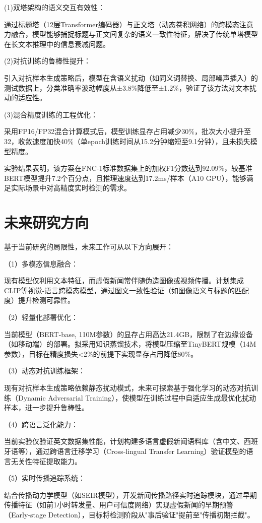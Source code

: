 \documentclass{cjc}
\begin{document}
(1)双塔架构的语义交互有效性：

通过标题塔（12层Transformer编码器）与正文塔（动态卷积网络）的跨模态注意力融合，模型能够捕捉标题与正文间复杂的语义一致性特征，解决了传统单塔模型在长文本推理中的信息衰减问题。

(2)对抗训练的鲁棒性提升：

引入对抗样本生成策略后，模型在含语义扰动（如同义词替换、局部噪声插入）的测试数据上，分类准确率波动幅度从±3.8\%降低至±1.2\%，验证了该方法对文本扰动的适应性。

(3)混合精度训练的工程优化：

采用FP16/FP32混合计算模式后，模型训练显存占用减少30\%，批次大小提升至32，收敛速度加快40\%（单epoch训练时间从15.2分钟缩短至9.1分钟），且未损失模型精度。

实验结果表明，该方案在FNC-1标准数据集上的加权F1分数达到92.09\%，较基准BERT模型提升7.2个百分点，且推理速度达到17.2ms/样本（A10 GPU），能够满足实际场景中对高精度实时检测的需求。

\section{未来研究方向}

基于当前研究的局限性，未来工作可从以下方向展开：

（1）多模态信息融合：

现有模型仅利用文本特征，而虚假新闻常伴随伪造图像或视频传播。计划集成CLIP等视觉-语言跨模态模型，通过图文一致性验证（如图像语义与标题的匹配度）提升检测可靠性。

（2）轻量化部署优化：

当前模型（BERT-base, 110M参数）的显存占用高达21.4GB，限制了在边缘设备（如移动端）的部署。拟采用知识蒸馏技术，将模型压缩至TinyBERT规模（14M参数），目标在精度损失<2\%的前提下实现显存占用降低80\%。

（3）动态对抗训练框架：

现有对抗样本生成策略依赖静态扰动模式，未来可探索基于强化学习的动态对抗训练（Dynamic Adversarial Training），使模型在训练过程中自适应生成最优化扰动样本，进一步提升鲁棒性。

（4）跨语言泛化能力：

当前实验仅验证英文数据集性能，计划构建多语言虚假新闻语料库（含中文、西班牙语等），通过跨语言迁移学习（Cross-lingual Transfer Learning）验证模型的语言无关性特征提取能力。

（5）实时传播追踪系统：

结合传播动力学模型（如SEIR模型），开发新闻传播路径实时追踪模块，通过早期传播特征（如前1小时转发量、用户可信度网络）实现虚假新闻的早期预警（Early-stage Detection），目标将检测阶段从"事后验证"提前至"传播初期拦截"。
\end{document}
